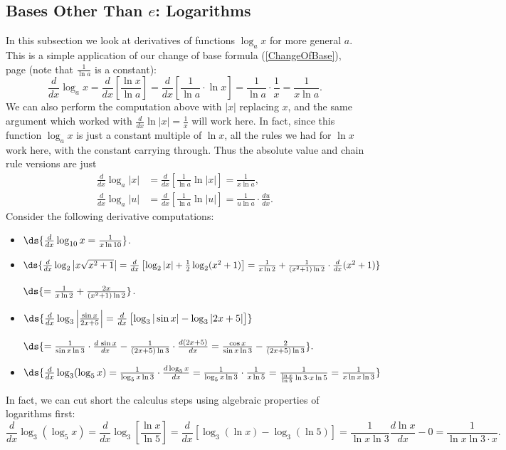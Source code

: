 \subsection{Bases Other Than $e$: Logarithms}
In this subsection we look at derivatives of 
functions $\log_ax$ for more general $a$.
This is a simple application of our
change of base formula (\ref{ChangeOfBase}),
page \pageref{ChangeOfBase} (note that
$\frac1{\ln a}$ is a constant):
$$\frac{d}{dx}\log_ax=\frac{d}{dx}\left[\frac{\ln x}{\ln a}
  \right] =\frac{d}{dx}\left[\frac1{\ln a}\cdot\ln x\right]
=\frac1{\ln a}\cdot\frac1x=\frac1{x\ln a}.$$
We can also perform the computation above with $|x|$
replacing $x$, and the same argument which worked
with $\frac{d}{dx}\ln |x|=\frac1x$ will work here.
In fact, since this function $\log_ax$ is just a constant
multiple of $\ln x$, all the rules we had for $\ln x$
work here, with the constant carrying through.
Thus the absolute value and chain rule versions are just
\begin{align}
\frac{d}{dx}\log_a|x|&=\frac{d}{dx}\left[\frac1{\ln a}
             \ln|x|\right]=\frac1{x\ln a},\label{DerivLog_a}\\
\frac{d}{dx}\log_a|u|&=\frac{d}{dx}\left[\frac1{\ln a}
             \ln|u|\right]=\frac1{u\ln a}\cdot\frac{du}{dx}.
              \label{DerivLog_aU}
\end{align}
\bex Consider the following derivative computations:
\begin{itemize}
\item $\ds{\frac{d}{dx}\log_{10}x=\frac1{x\ln10}}$.
\item $\ds{\frac{d}{dx}\log_2\left|x\sqrt{x^2+1}\right|
           =\frac{d}{dx}\left[\log_2|x|
         +\frac12\log_2(x^2+1)\right]
         =\frac1{x\ln2}+\frac1{(x^2+1)\ln2}
           \cdot\frac{d}{dx}(x^2+1)}$

      $\ds{=\frac1{x\ln2}+\frac{2x}{(x^2+1)\ln2}}$.
\item $\ds{\frac{d}{dx}\log_3\left|\frac{\sin x}{2x+5}\right|
        =\frac{d}{dx}\left[\log_3|\sin x|
          -\log_3|2x+5|\vphantom{X_X^X}\right]}$

       $\ds{    =\frac1{\sin x\ln3}\cdot\frac{d\,\sin x}{dx}
     -\frac1{(2x+5)\ln3}\cdot\frac{d(2x+5)}{dx}
     =\frac{\cos x}{\sin x\ln3}-\frac{2}{(2x+5)\ln3}}.$
\item $\ds{\frac{d}{dx}\log_3(\log_5x)
     =\frac{1}{\log_5x\ln3}\cdot\frac{d\log_5x}{dx}
     =\frac1{\log_5x\ln3}\cdot\frac1{x\ln5}
     =\frac1{\frac{\ln x}{\ln 5}\ln 3\cdot x\ln 5}
     =\frac1{x\ln x\ln3}}$

\end{itemize}
In fact, we can cut short the {\rm calculus} steps using algebraic
properties of logarithms first:
$$\frac{d}{dx}\log_3(\log_5x)
 =\frac{d}{dx}\log_3\left[\frac{\ln x}{\ln 5}\right]
 =\frac{d}{dx}\left[\log_3(\ln x)-\log_3(\ln 5)\right]
 =\frac1{\ln x\ln3}\frac{d\ln x}{dx}-0
 =\frac1{\ln x\ln 3\cdot x}.$$

